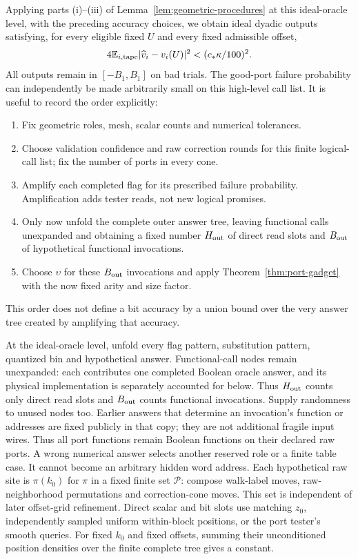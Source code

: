 Applying parts \textup{(i)}--\textup{(iii)} of
Lemma~\ref{lem:geometric-procedures} at this ideal-oracle level, with
the preceding accuracy choices, we obtain ideal dyadic outputs satisfying,
for every eligible fixed $U$ and every fixed admissible offset,
\begin{equation}\label{out:ideal-accuracy}
 4\mathbb{E}_{i,\mathrm{tape}}\lvert \widehat v_i-v_i(U)\rvert^2
       <(c_*\kappa/100)^2.
\end{equation}
All outputs remain in $[-B_1,B_1]$ on bad trials. The good-port failure
probability can independently be made arbitrarily small on this
high-level call list. It is useful to record the order explicitly:
\begin{enumerate}[label=\textup{(\arabic*)}]
\item Fix geometric roles, mesh, scalar counts and numerical tolerances.
\item Choose validation confidence and raw correction rounds for this
finite logical-call list; fix the number of ports in every cone.
\item Amplify each completed flag for its prescribed failure probability.
Amplification adds tester reads, not new logical promises.
\item Only now unfold the complete outer answer tree, leaving functional
calls unexpanded and obtaining a fixed number $H_{\rm out}$ of direct
read slots and $B_{\rm out}$ of hypothetical functional invocations.
\item Choose $\upsilon$ for these $B_{\rm out}$ invocations and apply
Theorem~\ref{thm:port-gadget} with the now fixed arity and size factor.
\end{enumerate}
This order does not define a bit accuracy by a union bound over the very
answer tree created by amplifying that accuracy.

At the ideal-oracle level, unfold every flag pattern, substitution
pattern, quantized bin and hypothetical answer. Functional-call nodes
remain unexpanded: each contributes one completed Boolean oracle answer,
and its physical implementation is separately accounted for below.
Thus $H_{\rm out}$ counts only direct read slots and $B_{\rm out}$ counts
functional invocations. Supply randomness to unused nodes too. Earlier
answers that determine an invocation's function or addresses are fixed
publicly in that copy; they are not additional fragile input wires.
Thus all port functions remain Boolean functions on their declared raw
ports. A wrong numerical answer selects another reserved role or a
finite table case. It cannot become an arbitrary hidden word address.
Each hypothetical raw site is $\pi(k_0)$ for $\pi$ in a fixed finite set
$\mathcal P$: compose walk-label moves, raw-neighborhood permutations
and correction-cone moves. This set is independent of later offset-grid
refinement. Direct scalar and bit slots use matching $z_0$, independently
sampled uniform within-block positions, or the port tester's smooth
queries. For fixed $k_0$ and fixed offsets, summing their unconditioned
position densities over the finite complete tree gives a constant.

